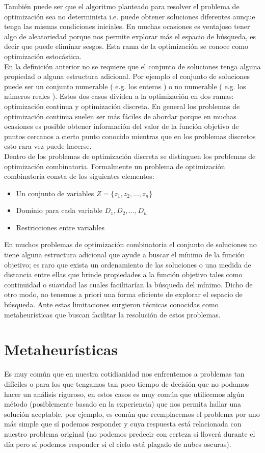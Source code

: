 También puede ser que el algoritmo planteado para resolver el problema de optimización sea no determinista i.e. puede obtener soluciones diferentes aunque tenga las mismas condiciones iniciales. En muchas ocasiones es ventajoso tener algo de aleatoriedad porque nos permite explorar más el espacio de búsqueda, es decir que puede eliminar sesgos. Esta rama de la optimización se conoce como optimización estocástica.\\

 En la definición anterior no se requiere que el conjunto de soluciones tenga alguna propiedad o alguna estructura adicional. Por ejemplo el conjunto de soluciones puede ser un conjunto numerable ( e.g. los enteros ) o no numerable ( e.g. los números reales ). Estos dos casos dividen a la optimización en dos ramas: optimización continua y optimización discreta. En general los problemas de optimización continua suelen ser más fáciles de abordar\cite{nocedal2006numerical} porque en muchas ocasiones es posible obtener información del valor de la función objetivo de puntos cercanos a cierto punto conocido mientras que en los problemas discretos esto rara vez puede hacerse.\\

Dentro de los problemas de optimización discreta se distinguen los problemas de optimización combinatoria. Formalmente un problema de optimización combinatoria consta de los siguientes elementos\cite{Blum2003}:
\begin{itemize}
    \item Un conjunto de variables $Z=\{z_1,z_2,...,z_n\}$
    \item Dominio para cada variable $D_1,D_2,...,D_n$
    \item Restricciones entre variables
\end{itemize}

En muchos problemas de optimización combinatoria el conjunto de soluciones no tiene alguna estructura adicional que ayude a buscar el mínimo de la función objetivo; es raro que exista un ordenamiento de las soluciones o una medida de distancia entre ellas que brinde propiedades a la función objetivo tales como continuidad o suavidad las cuales facilitarían la búsqueda del mínimo. Dicho de otro modo, no tenemos a priori una forma eficiente de explorar el espacio de búsqueda. Ante estas limitaciones surgieron técnicas conocidas como metaheurísticas que buscan facilitar la resolución de estos problemas.

\section{Metaheurísticas}
Es muy común que en nuestra cotidianidad nos enfrentemos a problemas tan difíciles o para los que tengamos tan poco tiempo de decisión que no podamos hacer un análisis riguroso, en estos casos es muy común que utilicemos algún método (posiblemente basado en la experiencia) que nos permita hallar una solución aceptable, por ejemplo, es común que reemplacemos el problema por uno más simple que sí podemos responder y cuya respuesta está relacionada con nuestro problema original (no podemos predecir con certeza si lloverá durante el día pero sí podemos responder si el cielo está plagado de nubes oscuras).

